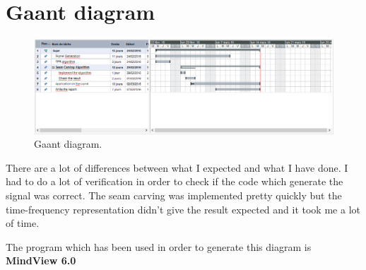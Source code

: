 \chapter*{Gaant diagram}

\begin{figure}[H]
\centering
    \includegraphics[scale=0.6,angle=0]{Images/GaantV2.PNG}
    \caption{Gaant diagram.}
    \label{fig:GaantV1}
\end{figure}

There are a lot of differences between what I expected and what I have done. I had to do a lot of verification in order to check if the code which generate the signal was correct. The seam carving was implemented pretty quickly but the time-frequency representation didn't give the result expected and it took me a lot of time.

The program which has been used in order to generate this diagram is \textbf{MindView 6.0}
